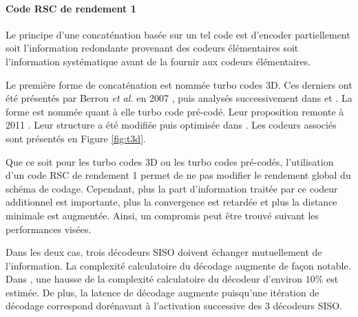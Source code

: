 \paragraph{Code RSC de rendement 1}
Le principe d'une concaténation basée sur un tel code est d'encoder partiellement soit l'information redondante provenant des codeurs élémentaires soit l'information systématique avant de la fournir aux codeurs élémentaires.

Le première forme de concaténation est nommée turbo codes 3D. Ces derniers ont été présentés par Berrou \textit{et al.} en 2007 \cite{TC3D_1}, puis analysés successivement dans \cite{TC3D_2} et \cite{TC3D_3}.
La forme est nommée quant à elle turbo code pré-codé. Leur proposition remonte à 2011 \cite{precoded}. Leur structure a été modifiée puis optimisée dans \cite{precoding}. Les codeurs associés sont présentés en Figure \ref{fig:t3d}.

Que ce soit pour les turbo codes 3D ou les turbo codes pré-codés, l'utilisation d'un code RSC de rendement 1 permet de ne pas modifier le rendement global du schéma de codage. Cependant, plus la part d'information 
traitée par ce codeur additionnel est importante, plus la convergence est retardée et plus la distance minimale est augmentée. Ainsi, un compromis peut être trouvé suivant les performances visées. 

Dans les deux cas, trois décodeurs SISO doivent échanger mutuellement de l'information. La complexité calculatoire du décodage augmente de façon notable. Dans \cite{TC3D_2}, une hausse de la complexité calculatoire du décodeur  d'environ $10\%$ est estimée. De plus, la latence de décodage augmente puisqu'une itération de décodage correspond dorénavant à l'activation successive des 3 décodeurs SISO.

